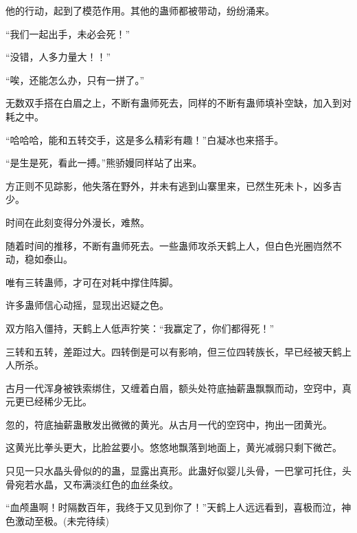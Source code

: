 \begin{this_body}
他的行动，起到了模范作用。其他的蛊师都被带动，纷纷涌来。

“我们一起出手，未必会死！”

“没错，人多力量大！！”

“唉，还能怎么办，只有一拼了。”

无数双手搭在白眉之上，不断有蛊师死去，同样的不断有蛊师填补空缺，加入到对耗之中。

“哈哈哈，能和五转交手，这是多么精彩有趣！”白凝冰也来搭手。

“是生是死，看此一搏。”熊骄嫚同样站了出来。

方正则不见踪影，他失落在野外，并未有逃到山寨里来，已然生死未卜，凶多吉少。

时间在此刻变得分外漫长，难熬。

随着时间的推移，不断有蛊师死去。一些蛊师攻杀天鹤上人，但白色光圈岿然不动，稳如泰山。

唯有三转蛊师，才可在对耗中撑住阵脚。

许多蛊师信心动摇，显现出迟疑之色。

双方陷入僵持，天鹤上人低声狞笑：“我赢定了，你们都得死！”

三转和五转，差距过大。四转倒是可以有影响，但三位四转族长，早已经被天鹤上人所杀。

古月一代浑身被铁索绑住，又缠着白眉，额头处符底抽薪蛊飘飘而动，空窍中，真元更已经稀少无比。

忽的，符底抽薪蛊散发出微微的黄光。从古月一代的空窍中，拘出一团黄光。

这黄光比拳头更大，比脸盆要小。悠悠地飘落到地面上，黄光减弱只剩下微芒。

只见一只水晶头骨似的的蛊，显露出真形。此蛊好似婴儿头骨，一巴掌可托住，头骨宛若水晶，又布满淡红色的血丝条纹。

“血颅蛊啊！时隔数百年，我终于又见到你了！”天鹤上人远远看到，喜极而泣，神色激动至极。(未完待续)

\end{this_body}


